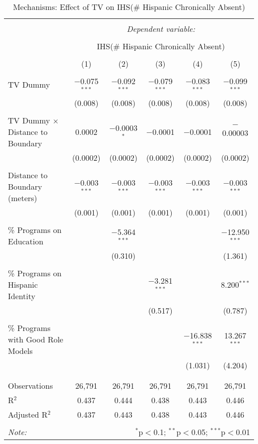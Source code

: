 
\begin{table}[!htbp] \centering 
  \caption{Mechanisms: Effect of TV on IHS(\# Hispanic Chronically Absent)} 
  \label{} 
\begin{tabular}{@{\extracolsep{-2pt}}lccccc} 
\\[-1.8ex]\hline 
\hline \\[-1.8ex] 
 & \multicolumn{5}{c}{\textit{Dependent variable:}} \\ 
\cline{2-6} 
\\[-1.8ex] & \multicolumn{5}{c}{IHS(\# Hispanic Chronically Absent)} \\ 
\\[-1.8ex] & (1) & (2) & (3) & (4) & (5)\\ 
\hline \\[-1.8ex] 
 TV Dummy & $-$0.075$^{***}$ & $-$0.092$^{***}$ & $-$0.079$^{***}$ & $-$0.083$^{***}$ & $-$0.099$^{***}$ \\ 
  & (0.008) & (0.008) & (0.008) & (0.008) & (0.008) \\ 
  & & & & & \\ 
 TV Dummy $\times$ Distance to Boundary & 0.0002 & $-$0.0003$^{*}$ & $-$0.0001 & $-$0.0001 & $-$0.00003 \\ 
  & (0.0002) & (0.0002) & (0.0002) & (0.0002) & (0.0002) \\ 
  & & & & & \\ 
 Distance to Boundary (meters) & $-$0.003$^{***}$ & $-$0.003$^{***}$ & $-$0.003$^{***}$ & $-$0.003$^{***}$ & $-$0.003$^{***}$ \\ 
  & (0.001) & (0.001) & (0.001) & (0.001) & (0.001) \\ 
  & & & & & \\ 
 \% Programs on Education &  & $-$5.364$^{***}$ &  &  & $-$12.950$^{***}$ \\ 
  &  & (0.310) &  &  & (1.361) \\ 
  & & & & & \\ 
 \% Programs on Hispanic Identity &  &  & $-$3.281$^{***}$ &  & 8.200$^{***}$ \\ 
  &  &  & (0.517) &  & (0.787) \\ 
  & & & & & \\ 
 \% Programs with Good Role Models &  &  &  & $-$16.838$^{***}$ & 13.267$^{***}$ \\ 
  &  &  &  & (1.031) & (4.204) \\ 
  & & & & & \\ 
\hline \\[-1.8ex] 
Observations & 26,791 & 26,791 & 26,791 & 26,791 & 26,791 \\ 
R$^{2}$ & 0.437 & 0.444 & 0.438 & 0.443 & 0.446 \\ 
Adjusted R$^{2}$ & 0.437 & 0.443 & 0.438 & 0.443 & 0.446 \\ 
\hline 
\hline \\[-1.8ex] 
\textit{Note:}  & \multicolumn{5}{r}{$^{*}$p$<$0.1; $^{**}$p$<$0.05; $^{***}$p$<$0.01} \\ 
\end{tabular} 
\end{table} 
